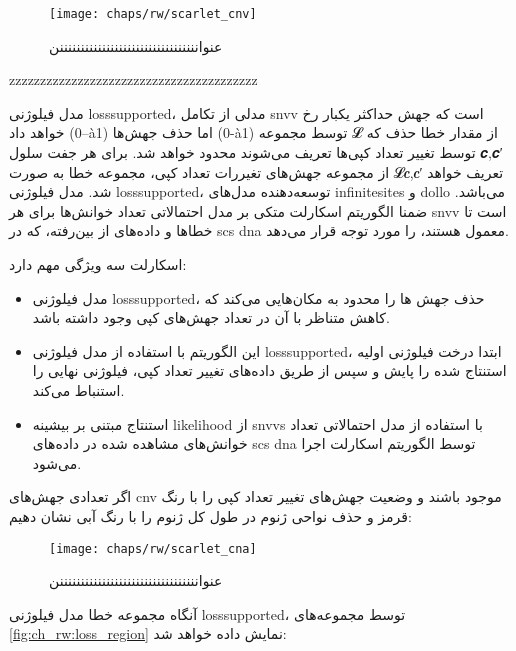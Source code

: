 \begin{figure}[!ht]
	\centerline{\texttt{[image: chaps/rw/scarlet\_cnv]}}
	\caption{عنوانننننننننننننننننننننننننننننننننن}
	\label{fig:ch_rw:scarlet_cnv}
\end{figure}


zzzzzzzzzzzzzzzzzzzzzzzzzzzzzzzzzzzzzzzz

مدل فیلوژنی \gls{losssupported}،  مدلی از تکامل \gls{snvv} است که جهش حداکثر یکبار رخ خواهد داد (0--à1) اما حذف جهش‌ها (0-à1) توسط مجموعه
𝓛
از مقدار خطا حذف که توسط تغییر تعداد کپی‌ها تعریف می‌شوند محدود خواهد شد. برای هر جفت سلول
𝒄,𝒄′
از مجموعه جهش‌های تغیررات تعداد کپی، مجموعه خطا به صورت
𝓛𝒄,𝒄′
تعریف خواهد شد. مدل فیلوژنی \gls{losssupported}، توسعه‌دهنده مدل‌های \gls{infinitesites} و \gls{dollo} می‌باشد. ضمنا الگوریتم اسکارلت متکی بر مدل احتمالاتی تعداد خوانش‌ها برای هر \gls{snvv} است تا خطاها و داده‌های از بین‌رفته، که در  \gls{scs} \gls{dna} معمول هستند، را مورد توجه قرار می‌دهد. 

اسکارلت سه ویژگی مهم دارد: 

\begin{itemize}
	\item     مدل فیلوژنی \gls{losssupported}، حذف جهش ها را محدود به مکان‌هایی می‌کند که کاهش متناظر با آن در تعداد جهش‌های کپی وجود داشته باشد. 
	
	\item 	این الگوریتم با استفاده از مدل فیلوژنی \gls{losssupported}، ابتدا درخت فیلوژنی اولیه استنتاج شده را پایش  و سپس از طریق داده‌های تغییر تعداد کپی، فیلوژنی نهایی را استنباط می‌کند. 
	\item	استنتاج مبتنی بر بیشینه  \gls{likelihood}  از \glspl{snvv} با استفاده از مدل احتمالاتی تعداد خوانش‌های مشاهده شده در داده‌های   \gls{scs} \gls{dna} توسط الگوریتم اسکارلت اجرا می‌شود.  
\end{itemize}




اگر تعدادی جهش‌های \gls{cnv} موجود باشند و  وضعیت جهش‌های تغییر تعداد کپی را با رنگ قرمز و حذف نواحی ژنوم در طول کل ژنوم را با رنگ آبی نشان دهیم:


\begin{figure}[!ht]
	\centerline{\texttt{[image: chaps/rw/scarlet\_cna]}}
	\caption{عنوانننننننننننننننننننننننننننننننننن}
	\label{fig:ch_rw:scarlet_cna}
\end{figure}

آنگاه مجموعه خطا مدل فیلوژنی \gls{losssupported}، توسط مجموعه‌های \ref{fig:ch_rw:loss_region} نمایش داده خواهد شد: 

